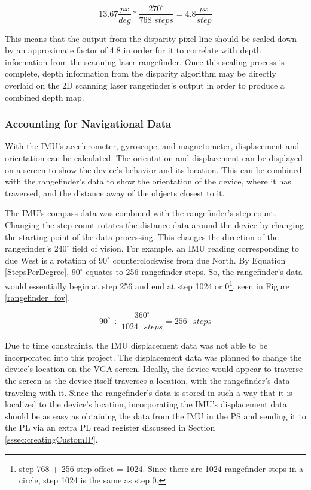\begin{equation} \label{yeeboi}
13.67\frac{px}{deg}*\frac{270^\circ}{768\,\,steps} = 4.8\frac{px}{step}
\end{equation}
\par
This means that the output from the disparity pixel line should be scaled down by an approximate factor of 4.8 in order for it to correlate with depth information from the scanning laser rangefinder. Once this scaling process is complete, depth information from the disparity algorithm may be directly overlaid on the 2D scanning laser rangefinder's output in order to produce a combined depth map. 

\subsubsection{Accounting for Navigational Data}
With the IMU's accelerometer, gyroscope, and magnetometer, displacement and orientation can be calculated. The orientation and displacement can be displayed on a screen to show the device's behavior and its location. This can be combined with the rangefinder's data to show the orientation of the device, where it has traversed, and the distance away of the objects closest to it.
\par
The IMU's compass data was combined with the rangefinder's step count. Changing the step count rotates the distance data around the device by changing the starting point of the data processing. This changes the direction of the rangefinder's $240^\circ$ field of vision. For example, an IMU reading corresponding to due West is a rotation of $90^\circ$ counterclockwise from due North. By Equation \ref{StepsPerDegree}, $90^\circ$ equates to 256 rangefinder steps. So, the rangefinder's data would essentially begin at step 256 and end at step 1024 or 0\footnote{step 768 + 256 step offset = 1024. Since there are 1024 rangefinder steps in a circle, step 1024 is the same as step 0.}, seen in Figure \ref{rangefinder_fov}.

\begin{equation}
	90^\circ \div \dfrac{360^\circ}{1024 \textrm{ } steps}  = 256 \textrm{ } steps
	\label{StepsPerDegree}
\end{equation}

\par
Due to time constraints, the IMU displacement data was not able to be incorporated into this project. The displacement data was planned to change the device's location on the VGA screen. Ideally, the device would appear to traverse the screen as the device itself traverses a location, with the rangefinder's data traveling with it. Since the rangefinder's data is stored in such a way that it is localized to the device's location, incorporating the IMU's displacement data should be as easy as obtaining the data from the IMU in the PS and sending it to the PL via an extra PL read register discussed in Section \ref{sssec:creatingCustomIP}.



